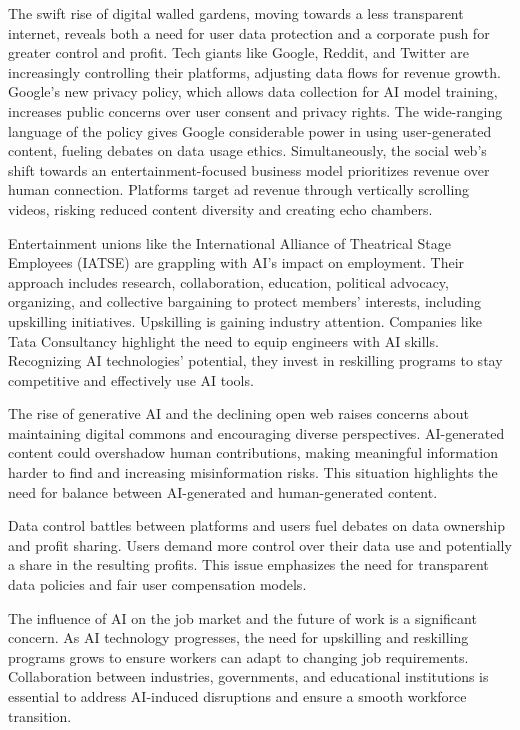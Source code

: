 The swift rise of digital walled gardens, moving towards a less transparent internet, reveals both a need for user data protection and a corporate push for greater control and profit. Tech giants like Google, Reddit, and Twitter are increasingly controlling their platforms, adjusting data flows for revenue growth. Google's new privacy policy, which allows data collection for AI model training, increases public concerns over user consent and privacy rights. The wide-ranging language of the policy gives Google considerable power in using user-generated content, fueling debates on data usage ethics. Simultaneously, the social web's shift towards an entertainment-focused business model prioritizes revenue over human connection. Platforms target ad revenue through vertically scrolling videos, risking reduced content diversity and creating echo chambers.\par 
Entertainment unions like the International Alliance of Theatrical Stage Employees (IATSE) are grappling with AI's impact on employment. Their approach includes research, collaboration, education, political advocacy, organizing, and collective bargaining to protect members' interests, including upskilling initiatives. Upskilling is gaining industry attention. Companies like Tata Consultancy highlight the need to equip engineers with AI skills. Recognizing AI technologies' potential, they invest in reskilling programs to stay competitive and effectively use AI tools.\par
The rise of generative AI and the declining open web raises concerns about maintaining digital commons and encouraging diverse perspectives. AI-generated content could overshadow human contributions, making meaningful information harder to find and increasing misinformation risks. This situation highlights the need for balance between AI-generated and human-generated content.\par

Data control battles between platforms and users fuel debates on data ownership and profit sharing. Users demand more control over their data use and potentially a share in the resulting profits. This issue emphasizes the need for transparent data policies and fair user compensation models.\par

The influence of AI on the job market and the future of work is a significant concern. As AI technology progresses, the need for upskilling and reskilling programs grows to ensure workers can adapt to changing job requirements. Collaboration between industries, governments, and educational institutions is essential to address AI-induced disruptions and ensure a smooth workforce transition.\par

